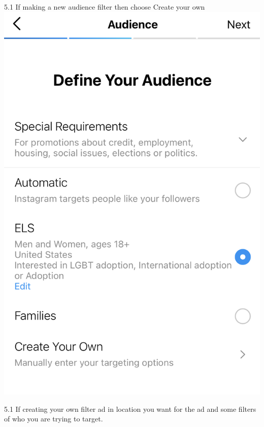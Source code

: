 \documentclass[]{book}
\begin{document}
5.1 If making a new audience filter then choose Create your own
\includegraphics{images/lab_protocols/ig_ads/3.png}

5.1 If creating your own filter ad in location you want for the ad and some filters of who you are trying to target.
\end{document}
